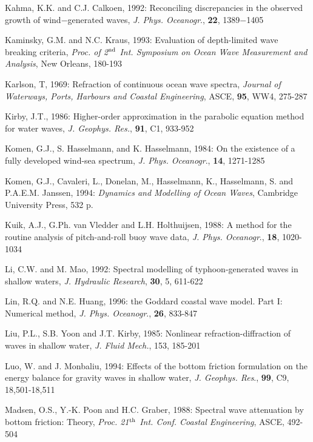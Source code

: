 \documentclass[12pt]{book}
\begin{document}
\begin{thebibliography}{10}
Kahma, K.K. and C.J. Calkoen, 1992: Reconciling discrepancies in the observed growth of
wind$-$generated waves, {\it J. Phys. Oceanogr}., {\bf 22}, 1389$-$1405

Kaminsky, G.M. and N.C. Kraus, 1993: Evaluation of depth-limited wave breaking criteria, {\it Proc.
of 2$^{{\rm nd}}$ Int. Symposium on Ocean Wave Measurement and Analysis}, New Orleans, 180-193

Karlson, T, 1969: Refraction of continuous ocean wave spectra, {\it Journal of Waterways, Ports, Harbours
and Coastal Engineering}, ASCE, {\bf 95}, WW4, 275-287

Kirby, J.T., 1986: Higher-order approximation in the parabolic equation method for water waves, {\it J.
Geophys. Res.}, {\bf 91}, C1, 933-952

Komen, G.J., S. Hasselmann, and K. Hasselmann, 1984: On the existence of a fully developed wind-sea
spectrum, {\it J. Phys. Oceanogr}., {\bf 14}, 1271-1285

Komen, G.J., Cavaleri, L., Donelan, M., Hasselmann, K., Hasselmann, S. and P.A.E.M. Janssen, 1994:
{\it Dynamics and Modelling of Ocean Waves}, Cambridge University Press, 532 p.

Kuik, A.J., G.Ph. van Vledder and L.H. Holthuijsen, 1988: A method for the routine  analysis of
pitch-and-roll buoy wave data, {\it J. Phys. Oceanogr}., {\bf 18}, 1020-1034

Li, C.W. and M. Mao, 1992: Spectral modelling of typhoon-generated waves in shallow waters, {\it J.
Hydraulic Research}, {\bf 30}, 5, 611-622

Lin, R.Q. and N.E. Huang, 1996: the Goddard coastal wave model. Part I: Numerical method, {\it J. Phys.
Oceanogr}., {\bf 26}, 833-847

Liu, P.L., S.B. Yoon and J.T. Kirby, 1985: Nonlinear refraction-diffraction of waves in shallow water, {\it J. Fluid
Mech.}, 153, 185-201

Luo, W. and J. Monbaliu, 1994: Effects of the bottom friction formulation on the energy balance for gravity
waves in shallow water, {\it J. Geophys. Res}., {\bf 99}, C9, 18,501-18,511

Madsen, O.S., Y.-K. Poon and H.C. Graber, 1988: Spectral wave attenuation by bottom friction: Theory,
{\it Proc. 21$^{{\rm th}}$ Int. Conf. Coastal Engineering}, ASCE, 492-504


\end{thebibliography}
\end{document}
